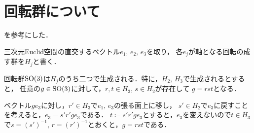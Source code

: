 \section{回転群について}
\cite{sugiura_yamanouchi}を参考にした．

\begin{prop}
		三次元Euclid空間の直交するベクトル$e_1$, $e_2$, $e_3$を取り，
		各$e_j$が軸となる回転の成す群を$H_j$と書く．

		回転群$\mathrm{SO}(3)$は$H_j$のうち二つで生成される．特に，$H_2$, $H_3$で生成されるとすると，
		任意の$g\in \mathrm{SO}(3)$に対して，$r, t\in H_3$, $s\in H_2$が存在して
		$g = rst$となる．
\end{prop}
\begin{pr}
		ベクトル$ge_3$に対し，$r'\in H_3$で$e_1$, $e_3$の張る面上に移し，
		$s'\in H_2$で$e_3$に戻すことを考えると，$e_3 = s'r'ge_3$である．
		$t\coloneqq s'r'ge_3$とすると，$e_3$を変えないので$t\in H_3$で$s = (s')^{-1}$, $r = (r')^{-1}$とおくと，$g = rst$である．
\end{pr}
